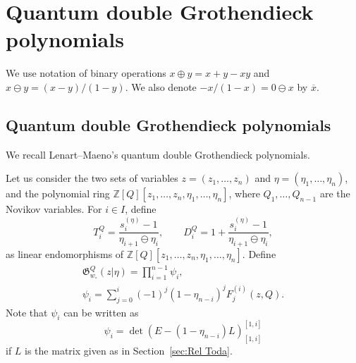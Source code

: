 \documentclass[pdftex]{sigma}
\numberwithin{equation}{section}
\newcommand{\Gro}[1]{\mathfrak{G}^Q_{#1}}
\newcommand{\wz}{w_\circ}
\newcommand{\Z}{\mathbb{Z}}
\newcommand{\fac}{\psi}
\theoremstyle{definition}
\begin{document}
\section{Quantum double Grothendieck polynomials}\label{sec:Groth}
We use notation of binary operations $x\oplus y=x+y-xy$ and
$x\ominus y=(x-y)/(1-y)$.
We also denote $-x/(1-x)=0\ominus x$ by $\overline{x}$.


\subsection{Quantum double Grothendieck polynomials}
\label{sec:G^Q(z|eta)}
We recall
Lenart--Maeno's
quantum double Grothendieck polynomials.



Let us consider
the two sets of variables
$z=(z_1,\dots,z_n)$ and
$\eta=(\eta_1,\dots,\eta_n)$, and the polynomial ring
$\Z[Q][z_1,\dots,z_n,\eta_1,\dots,\eta_n]$,
where $Q_1,\dots,Q_{n-1}$ are the Novikov variables.
For $i\in I$, define
\begin{equation}
\label{eq:DiQ,TiQ}
T_i^Q
=\frac{s_i^{(\eta)}-1}{\eta_{i+1}\ominus \eta_{i}},\qquad
D_i^Q
=1+\frac{s_i^{(\eta)}-1}{\eta_{i+1}\ominus \eta_{i}},
\end{equation}
as linear endomorphisms of
$\Z[Q][z_1,\dots,z_n,\eta_1,\dots,\eta_n]$.
Define
\begin{gather}
\label{eq:G_longest}
\Gro{\wz}(z|\eta)=
\prod_{i=1}^{n-1}
\fac_i,\\
\fac_i=\sum_{j=0}^i
(-1)^j
(1-\eta_{n-i})^j
F_j^{(i)}(z,Q).
\label{eq:def phi}
\end{gather}
Note that $\fac_i$ can be written as
\begin{equation}
\label{eq:phi det}
\fac_i=\det(E-(1-\eta_{n-i})L)^{[1,i]}_{[1,i]}
\end{equation}
if $L$ is the matrix given as in Section~\ref{sec:Rel Toda}.
\end{document}
